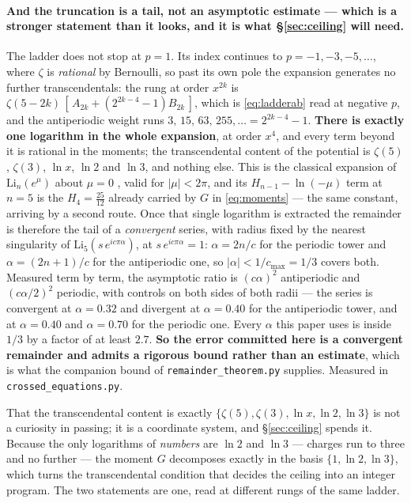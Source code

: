 \documentclass[11pt,a4paper]{article}
\begin{document}
\paragraph{And the truncation is a tail, not an asymptotic estimate --- which is a stronger
statement than it looks, and it is what \S\ref{sec:ceiling} will need.} The ladder does not stop at $p=1$. Its index continues to
$p=-1,-3,-5,\dots$, where $\zeta$ is \emph{rational} by Bernoulli, so past its own pole the
expansion generates no further transcendentals: the rung at order $x^{2k}$ is
$\zeta(5-2k)\,[\,A_{2k}+(2^{2k-4}-1)B_{2k}\,]$, which is \eqref{eq:ladderab} read at negative $p$,
and the antiperiodic weight runs $3,\,15,\,63,\,255,\dots=2^{2k-4}-1$. \textbf{There is exactly one
logarithm in the whole expansion}, at order $x^4$, and every term beyond it is rational in the
moments; the transcendental content of the potential is $\zeta(5)$, $\zeta(3)$, $\ln x$, $\ln 2$
and $\ln 3$, and nothing else. This is the classical expansion of $\mathrm{Li}_n(e^{\mu})$ about
$\mu=0$ \cite{Lewin}, valid for $|\mu|<2\pi$, and its $H_{n-1}-\ln(-\mu)$ term at $n=5$ is the
$H_4=\tfrac{25}{12}$ already carried by $G$ in \eqref{eq:moments} --- the same constant, arriving
by a second route. Once that single logarithm is extracted the remainder is therefore
the tail of a \emph{convergent} series, with radius fixed by the nearest singularity of
$\mathrm{Li}_5(s\,e^{ic\pi\alpha})$, at $s\,e^{ic\pi\alpha}=1$: $\alpha=2n/c$ for the periodic
tower and $\alpha=(2n+1)/c$ for the antiperiodic one, so $|\alpha|<1/c_{\max}=1/3$ covers both.
Measured term by term, the asymptotic ratio is $(c\alpha)^2$ antiperiodic and $(c\alpha/2)^2$
periodic, with controls on both sides of both radii --- the series is convergent at
$\alpha=0.32$ and divergent at $\alpha=0.40$ for the antiperiodic tower, and at $\alpha=0.40$ and
$\alpha=0.70$ for the periodic one. Every $\alpha$ this paper uses is inside $1/3$ by a factor of
at least $2.7$. \textbf{So the error committed here is a convergent remainder and admits a rigorous
bound rather than an estimate}, which is what the companion bound of
\texttt{remainder\_\allowbreak theorem.py} supplies. Measured in
\texttt{crossed\_\allowbreak equations.py}.

That the transcendental content is exactly $\{\zeta(5),\zeta(3),\ln x,\ln 2,\ln 3\}$ is not a
curiosity in passing; it is a coordinate system, and \S\ref{sec:ceiling} spends it. Because the only
logarithms of \emph{numbers} are $\ln2$ and $\ln3$ --- charges run to three and no further --- the
moment $G$ decomposes exactly in the basis $\{1,\ln2,\ln3\}$, which turns the transcendental
condition that decides the ceiling into an integer program. The two statements are one, read at
different rungs of the same ladder.
\end{document}
